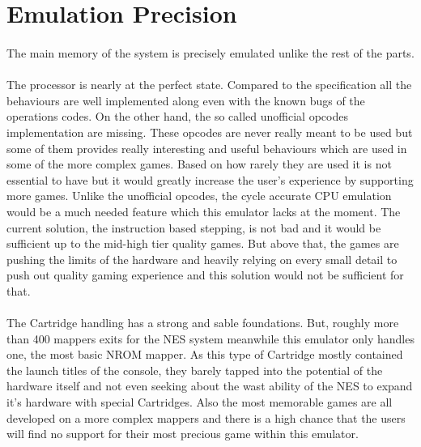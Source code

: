 \documentclass[]{report}
\begin{document}
\section{Emulation Precision}
\paragraph{ }
The main memory of the system is precisely emulated unlike the rest of the parts.

\paragraph{ }
The processor is nearly at the perfect state. Compared to the specification all the behaviours are well implemented along even with the known bugs of the operations codes. On the other hand, the so called unofficial opcodes implementation are missing. These opcodes are never really meant to be used but some of them provides really interesting and useful behaviours which are used in some of the more complex games. Based on how rarely they are used it is not essential to have but it would greatly increase the user's experience by supporting more games. Unlike the unofficial opcodes, the cycle accurate CPU emulation would be a much needed feature which this emulator lacks at the moment. The current solution, the instruction based stepping, is not bad and it would be sufficient up to the mid-high tier quality games. But above that, the games are pushing the limits of the hardware and heavily relying on every small detail to push out quality gaming experience and this solution would not be sufficient for that.

\paragraph{ } 
The Cartridge handling has a strong and sable foundations. But, roughly more than 400 mappers exits for the NES system meanwhile this emulator only handles one, the most basic NROM mapper. As this type of Cartridge mostly contained the launch titles of the console, they barely tapped into the potential of the hardware itself and not even seeking about the wast ability of the NES to expand it's hardware with special Cartridges. Also the most memorable games are all developed on a more complex mappers and there is a high chance that the users will find no support for their most precious game within this emulator.
\end{document}
